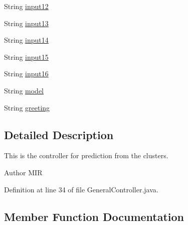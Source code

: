 \begin{DoxyCompactItemize}
\item 
String \hyperlink{classorg_1_1jboss_1_1as_1_1quickstarts_1_1greeter_1_1web_1_1_general_controller_a3d2ab84e219ad0f48f7a7ff1bc7ab06b}{input12}
\item 
String \hyperlink{classorg_1_1jboss_1_1as_1_1quickstarts_1_1greeter_1_1web_1_1_general_controller_a027de7ab9f17d18e29161d2f54c8e6fc}{input13}
\item 
String \hyperlink{classorg_1_1jboss_1_1as_1_1quickstarts_1_1greeter_1_1web_1_1_general_controller_a2b454987098aeb5ad2ea9345fa7e9f53}{input14}
\item 
String \hyperlink{classorg_1_1jboss_1_1as_1_1quickstarts_1_1greeter_1_1web_1_1_general_controller_aca44aa6719378ca1a19c49987cd8c2a5}{input15}
\item 
String \hyperlink{classorg_1_1jboss_1_1as_1_1quickstarts_1_1greeter_1_1web_1_1_general_controller_a3fa8d3eae8cd39f7d90a294181cce4c4}{input16}
\item 
String \hyperlink{classorg_1_1jboss_1_1as_1_1quickstarts_1_1greeter_1_1web_1_1_general_controller_abf9187f42f1b40ee43bc308b6166eeb1}{model}
\item 
String \hyperlink{classorg_1_1jboss_1_1as_1_1quickstarts_1_1greeter_1_1web_1_1_general_controller_a692b8a8a7a28e94932aee83bd88d4e55}{greeting}
\end{DoxyCompactItemize}


\subsection{Detailed Description}
This is the controller for prediction from the clusters. 

\begin{DoxyAuthor}{Author}
M\+IR 
\end{DoxyAuthor}


Definition at line 34 of file General\+Controller.\+java.



\subsection{Member Function Documentation}
\mbox{\label{classorg_1_1jboss_1_1as_1_1quickstarts_1_1greeter_1_1web_1_1_general_controller_afee1b5acfd689b560ed5ed87bb78dac4}} 
